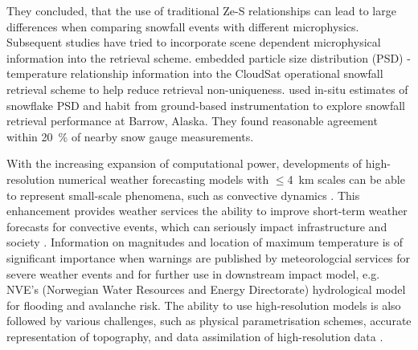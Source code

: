 They concluded, that the use of traditional Ze-S relationships can lead to large differences when comparing snowfall events with different microphysics.
\\
Subsequent studies have tried to incorporate scene dependent microphysical information into the retrieval scheme.  \citet{wood_estimation_2011} embedded particle size distribution (PSD) - temperature relationship information into the CloudSat operational snowfall retrieval scheme to help reduce retrieval non-uniqueness. \citet{cooper_variational_2017} used in-situ estimates of snowflake PSD and habit from ground-based instrumentation to explore snowfall retrieval performance at Barrow, Alaska. They found reasonable agreement within \SI{20}{\percent} of nearby snow gauge measurements.
\par\medskip
\noindent
With the increasing expansion of computational power, developments of high-resolution numerical weather forecasting models with $\le$\SI{4}{\km} scales can be able to represent small-scale phenomena, such as convective dynamics \citep{gowan_validation_2018}. This enhancement provides weather services the ability to improve short-term weather forecasts for convective events, which can seriously impact infrastructure and society \citep{muller_arome-metcoop:_2017}. 
Information on magnitudes and location of maximum temperature is of significant importance when warnings are published by meteorologcial services for severe weather events and for further use in downstream impact model, e.g. NVE's (Norwegian Water Resources and Energy Directorate) hydrological model for flooding and avalanche risk.
The ability to use high-resolution models is also followed by various challenges, such as physical parametrisation schemes, accurate representation of topography, and data assimilation of high-resolution data \citep{sun_convective-scale_2005}.
\\
